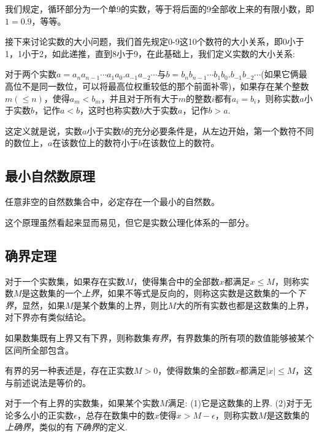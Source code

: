 我们规定，循环部分为一个单9的实数，等于将后面的9全部收上来的有限小数，即$1=0.\dot{9}$，等等。

接下来讨论实数的大小问题，我们首先规定0-9这10个数符的大小关系，即0小于1，1小于2，如此递推，直到8小于9，在此基础上，我们定义实数的大小关系:
\begin{definition}
  对于两个实数$a=a_na_{n-1}\cdots a_1a_0.a_{-1}a_{-2}\cdots$与$b=b_nb_{n-1}\cdots b_1b_0.b_{-1}b_{-2}\cdots$(如果它俩最高位不是同一数位，可以将最高位权重较低的那个前面补零)，如果存在某个整数$m (\leqslant n)$，使得$a_m<b_m$，并且对于所有大于$m$的整数$i$都有$a_i=b_i$，则称实数$a$小于实数$b$，记作$a<b$，这时也称实数$b$大于实数$a$，记作$b>a$.
\end{definition}

这定义就是说，实数$a$小于实数$b$的充分必要条件是，从左边开始，第一个数符不同的数位上，$a$在该数位上的数符小于$b$在该数位上的数符。

\subsection{最小自然数原理}
\label{sec:minimum-nature-number-principle}

\begin{principle}[最小自然数原理]
  任意非空的自然数集合中，必定存在一个最小的自然数。
\end{principle}

这个原理虽然看起来显而易见，但它是实数公理化体系的一部分。

\subsection{确界定理}
\label{sec:least-bound-theorem}

对于一个实数集，如果存在实数$M$，使得集合中的全部数$x$都满足$x \leqslant M$，则称实数$M$是这数集的一个\emph{上界}，如果不等式是反向的，则称这实数是这数集的一个\emph{下界}，显然，如果$M$是某个数集的上界，则比$M$大的所有实数也都是这数集的上界，对下界亦有类似结论。

如果数集既有上界又有下界，则称数集\emph{有界}，有界数集的所有项的数值能够被某个区间所全部包含。

有界的另一种表述是，存在正实数$M>0$，使得数集的全部数$x$都满足$|x| \leqslant M$，这与前述说法是等价的。

\begin{definition}
对于一个有上界的实数集，如果某个实数$M$满足: (1)它是这数集的上界. (2)对于无论多么小的正实数$\epsilon$，总存在数集中的数$x$使得$x>M-\epsilon$，则称实数$M$是这数集的\emph{上确界}，类似的有\emph{下确界}的定义.
\end{definition}

